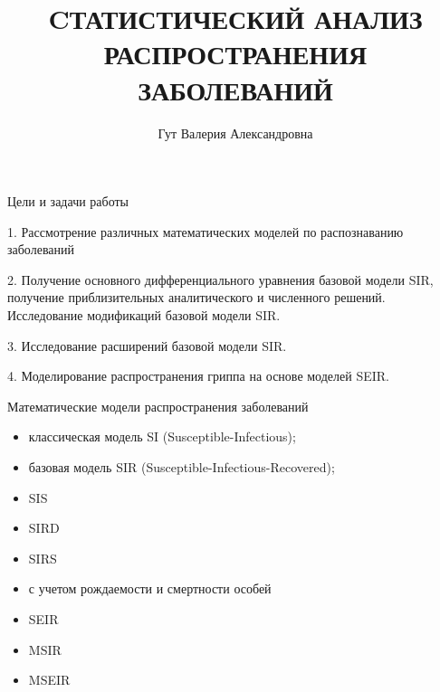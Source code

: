 \documentclass[notheorems]{beamer}
\title[Модели распространения заболеваний]{\Large CТАТИСТИЧЕСКИЙ АНАЛИЗ РАСПРОСТРАНЕНИЯ ЗАБОЛЕВАНИЙ}
\author[В. А. Гут]{Гут Валерия Александровна}
\institute[]{Научный руководитель: С.В. Лобач}
\date[]{}%
\begin{document}
\begin{frame}[plain]
  \titlepage
\end{frame}


\begin{frame}{Цели и задачи работы}

1. Рассмотрение различных математических моделей по распознаванию  заболеваний

2. Получение основного дифференциального уравнения базовой модели SIR, получение приблизительных аналитического и численного решений. Исследование модификаций базовой модели SIR.

3. Исследование расширений базовой модели SIR.

4. Моделирование распространения гриппа на основе моделей SEIR.


\end{frame}


\begin{frame}
	{Математические модели распространения заболеваний}
	\begin{itemize}
		\item классическая модель SI (Susceptible-Infectious);
		\item базовая модель SIR (Susceptible-Infectious-Recovered);
		\item SIS
		\item SIRD
		\item SIRS
		\item с учетом рождаемости и смертности особей
		\item SEIR
		\item MSIR
		\item MSEIR
	\end{itemize}
\end{frame}

\end{document}
